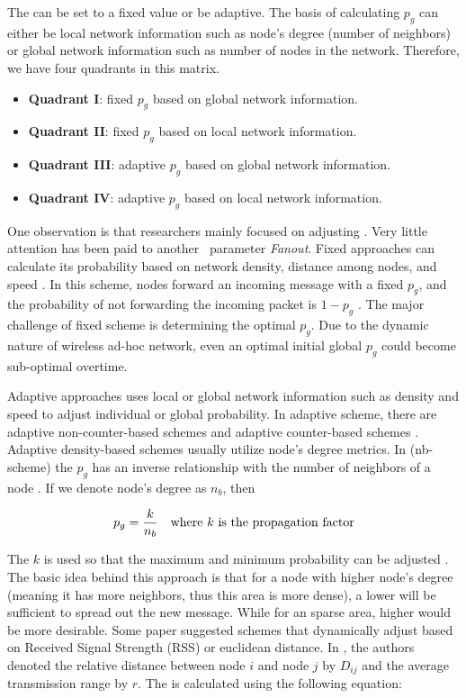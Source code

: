 The \emph{\pog} can be set to a fixed value or be adaptive. The basis of calculating $p_g$ can either be local network information such as node's degree (number of neighbors) or global network information such as number of nodes in the network. Therefore, we have four quadrants in this matrix. 

\begin{itemize}
	\item \textbf{Quadrant I}: fixed $p_g$ based on global network information. 
	\item \textbf{Quadrant II}: fixed $p_g$ based on local network information. 
	\item \textbf{Quadrant III}: adaptive $p_g$ based on global network information. 
	\item \textbf{Quadrant IV}: adaptive $p_g$ based on local network information. 
\end{itemize}

One observation is that researchers mainly focused on adjusting \emph{\pog}. Very little attention has been paid to another \gp ~parameter \emph{Fanout}. Fixed \emph{\pog} approaches can calculate its probability based on network density, distance among nodes, and speed \cite{2015survey}. In this scheme, nodes forward an incoming message with a fixed $p_g$, and the probability of not forwarding the incoming packet is $1-p_g$ \cite{2015survey}. The major challenge of fixed scheme is determining the optimal $p_g$. Due to the dynamic nature of wireless ad-hoc network, even an optimal initial global $p_g$ could become sub-optimal overtime. 

Adaptive \emph{\pog} approaches uses local or global network information such as density and speed to adjust individual or global probability. In adaptive scheme, there are adaptive non-counter-based schemes and adaptive counter-based schemes \cite{2015survey}. Adaptive density-based schemes usually utilize node's degree metrics. In (nb-scheme) the $p_g$ has an inverse relationship with the number of neighbors of a node \cite{cartigny2003border}. If we denote node's degree as $n_b$, then 

\[ p_g = \frac{k}{n_b} \mbox{\quad where $k$ is the propagation factor}\]

The $k$ is used so that the maximum and minimum probability can be adjusted \cite{cartigny2003border}. The basic idea behind this approach is that for a node with higher node's degree (meaning it has more neighbors, thus this area is more dense), a lower \emph{\pog} will be sufficient to spread out the new message. While for an sparse area, higher \emph{\pog} would be more desirable. Some paper \cite{qing2010dynamic}\cite{wisitpongphan2007broadcast} suggested schemes that dynamically adjust \emph{\pog} based on Received Signal Strength (RSS) or euclidean distance. In \cite{wisitpongphan2007broadcast}, the authors denoted the relative distance between node $i$ and node $j$ by $D_{ij}$ and the average transmission range by $r$. The \emph{\pog} is calculated using the following equation:

